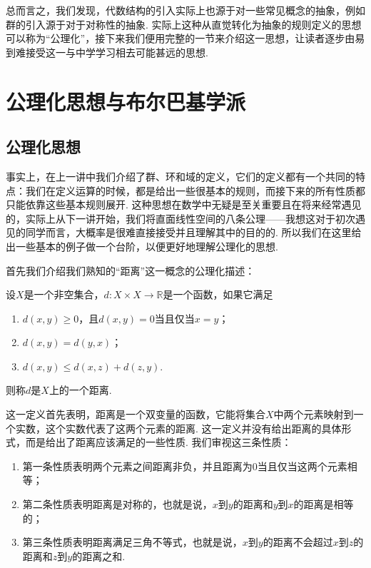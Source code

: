 总而言之，我们发现，代数结构的引入实际上也源于对一些常见概念的抽象，例如群的引入源于对于对称性的抽象. 实际上这种从直觉转化为抽象的规则定义的思想可以称为``公理化''，接下来我们便用完整的一节来介绍这一思想，让读者逐步由易到难接受这一与中学学习相去可能甚远的思想.

\section*{公理化思想与布尔巴基学派}

\subsection*{公理化思想}
事实上，在上一讲中我们介绍了群、环和域的定义，它们的定义都有一个共同的特点：我们在定义运算的时候，都是给出一些很基本的规则，而接下来的所有性质都只能依靠这些基本规则展开. 这种思想在数学中无疑是至关重要且在将来经常遇见的，实际上从下一讲开始，我们将直面线性空间的八条公理——我想这对于初次遇见的同学而言，大概率是很难直接接受并且理解其中的目的的. 所以我们在这里给出一些基本的例子做一个台阶，以便更好地理解公理化的思想.

首先我们介绍我们熟知的``距离''这一概念的公理化描述：
\begin{definition*}
    设$X$是一个非空集合，$d:X\times X\to \mathbb{R}$是一个函数，如果它满足
    \begin{enumerate}
        \item $d(x,y)\geq 0$，且$d(x,y)=0$当且仅当$x=y$；
        \item $d(x,y)=d(y,x)$；
        \item $d(x,y)\leq d(x,z)+d(z,y)$.
    \end{enumerate}
    则称$d$是$X$上的一个距离.
\end{definition*}

这一定义首先表明，距离是一个双变量的函数，它能将集合$X$中两个元素映射到一个实数，这个实数代表了这两个元素的距离. 这一定义并没有给出距离的具体形式，而是给出了距离应该满足的一些性质. 我们审视这三条性质：
\begin{enumerate}
    \item 第一条性质表明两个元素之间距离非负，并且距离为0当且仅当这两个元素相等；
    \item 第二条性质表明距离是对称的，也就是说，$x$到$y$的距离和$y$到$x$的距离是相等的；
    \item 第三条性质表明距离满足三角不等式，也就是说，$x$到$y$的距离不会超过$x$到$z$的距离和$z$到$y$的距离之和.
\end{enumerate}

